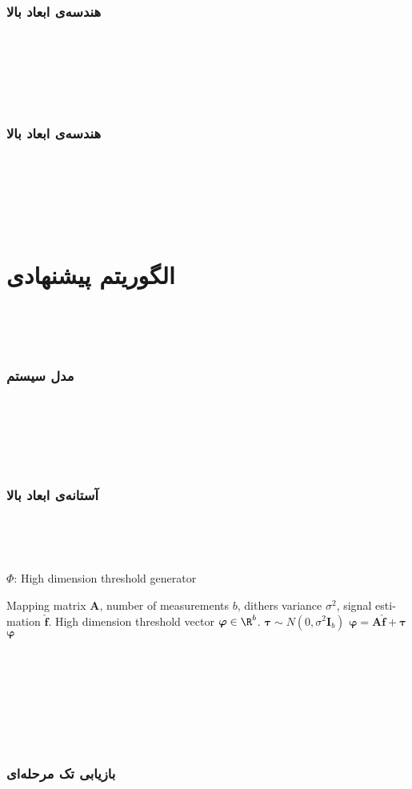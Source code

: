 ‎\begin{frame}‎
\frametitle{هندسه‌ی ابعاد بالا}
\framesubtitle{}
‎\end{frame}‎‎
‎
‎‎\begin{frame}‎
\frametitle{هندسه‌ی ابعاد بالا}
\framesubtitle{}
‎\end{frame}‎‎

‎%
‎%
‎%
‎%

\section{‏الگوریتم پیشنهادی‎\hfill}‎
‎
‎\begin{frame}‎
\frametitle{‎‏‏مدل سیستم}

‎\end{frame}‎
‎\begin{frame}‎
\frametitle{‎‏آستانه‌ی ابعاد بالا}
‎‎\begin{latin}‎‎
\begin{algorithm}
	\caption{$ \Phi $: High dimension threshold generator}
	\label{alg:HDTG}
	\begin{algorithmic}[1]
		\renewcommand{\algorithmicrequire}{\textbf{Input:}}
		\renewcommand{\algorithmicensure}{\textbf{Output:}}
		\REQUIRE Mapping matrix $ \bm{A} $, number of measurements $ b $, dithers variance $ \sigma^{2} $, signal estimation $ \hat{\bm{f}} $.
		\ENSURE High dimension threshold vector $\bm{\varphi}\in \R^{b}$.
		\STATE $ \bm{\tau}\sim N(0,\sigma^{2}\bm{I}_{b} ) $
		\STATE  $ \bm{\varphi}=\bm{A}\hat{\bm{f}}+\bm{\tau} $
		\RETURN $ \bm{\varphi} $
	\end{algorithmic} 
\end{algorithm}
‎\end{latin}‎
‎\end{frame}‎
‎‎
‎\begin{frame}‎
\frametitle{‎‏‏بازیابی تک مرحله‌ای}

‎\end{frame}‎

